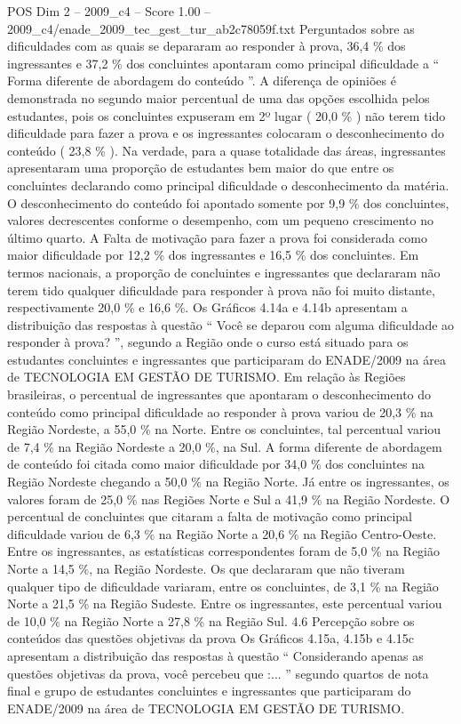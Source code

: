 \begin{textsample}{POS Dim 2 – 2009\_c4 – Score 1.00 – 2009\_c4/enade\_2009\_tec\_gest\_tur\_ab2c78059f.txt}
Perguntados sobre as dificuldades com as quais se depararam ao responder à prova, 36,4 \% dos ingressantes e 37,2 \% dos concluintes apontaram como principal dificuldade a “ Forma diferente de abordagem do conteúdo ”.
A diferença de opiniões é demonstrada no segundo maior percentual de uma das opções escolhida pelos estudantes, pois os concluintes expuseram em 2º lugar ( 20,0 \% ) não terem tido dificuldade para fazer a prova e os ingressantes colocaram o desconhecimento do conteúdo ( 23,8 \% ).
Na verdade, para a quase totalidade das áreas, ingressantes apresentaram uma proporção de estudantes bem maior do que entre os concluintes declarando como principal dificuldade o desconhecimento da matéria.
O desconhecimento do conteúdo foi apontado somente por 9,9 \% dos concluintes, valores decrescentes conforme o desempenho, com um pequeno crescimento no último quarto.
A Falta de motivação para fazer a prova foi considerada como maior dificuldade por 12,2 \% dos ingressantes e 16,5 \% dos concluintes.
Em termos nacionais, a proporção de concluintes e ingressantes que declararam não terem tido qualquer dificuldade para responder à prova não foi muito distante, respectivamente 20,0 \% e 16,6 \%.
Os Gráficos 4.14a e 4.14b apresentam a distribuição das respostas à questão “ Você se deparou com alguma dificuldade ao responder à prova? ”, segundo a Região onde o curso está situado para os estudantes concluintes e ingressantes que participaram do ENADE/2009 na área de TECNOLOGIA EM GESTÃO DE TURISMO.
Em relação às Regiões brasileiras, o percentual de ingressantes que apontaram o desconhecimento do conteúdo como principal dificuldade ao responder à prova variou de 20,3 \% na Região Nordeste, a 55,0 \% na Norte.
Entre os concluintes, tal percentual variou de 7,4 \% na Região Nordeste a 20,0 \%, na Sul.
A forma diferente de abordagem de conteúdo foi citada como maior dificuldade por 34,0 \% dos concluintes na Região Nordeste chegando a 50,0 \% na Região Norte.
Já entre os ingressantes, os valores foram de 25,0 \% nas Regiões Norte e Sul a 41,9 \% na Região Nordeste.
O percentual de concluintes que citaram a falta de motivação como principal dificuldade variou de 6,3 \% na Região Norte a 20,6 \% na Região Centro-Oeste.
Entre os ingressantes, as estatísticas correspondentes foram de 5,0 \% na Região Norte a 14,5 \%, na Região Nordeste.
Os que declararam que não tiveram qualquer tipo de dificuldade variaram, entre os concluintes, de 3,1 \% na Região Norte a 21,5 \% na Região Sudeste.
Entre os ingressantes, este percentual variou de 10,0 \% na Região Norte a 27,8 \% na Região Sul. 4.6 Percepção sobre os conteúdos das questões objetivas da prova Os Gráficos 4.15a, 4.15b e 4.15c apresentam a distribuição das respostas à questão “ Considerando apenas as questões objetivas da prova, você percebeu que :... ” segundo quartos de nota final e grupo de estudantes concluintes e ingressantes que participaram do ENADE/2009 na área de TECNOLOGIA EM GESTÃO DE TURISMO.

\end{textsample}
